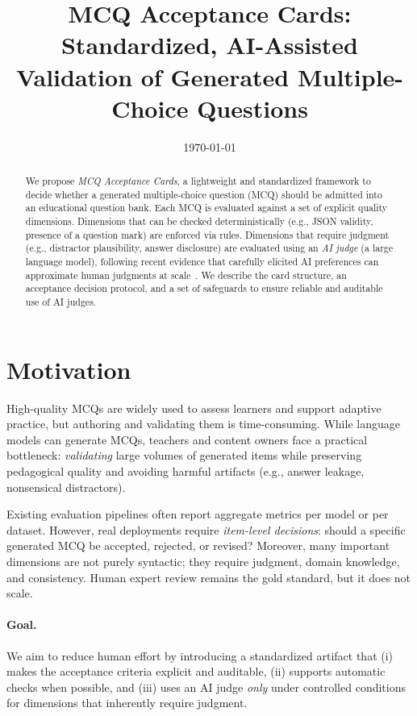 \documentclass[11pt]{article}
\title{MCQ Acceptance Cards: Standardized, AI-Assisted Validation of Generated Multiple-Choice Questions}
\date{\today}
\begin{document}
\maketitle

\begin{abstract}
We propose \emph{MCQ Acceptance Cards}, a lightweight and standardized framework to decide whether a generated multiple-choice question (MCQ) should be admitted into an educational question bank. Each MCQ is evaluated against a set of explicit quality dimensions. Dimensions that can be checked deterministically (e.g., JSON validity, presence of a question mark) are enforced via rules. Dimensions that require judgment (e.g., distractor plausibility, answer disclosure) are evaluated using an \emph{AI judge} (a large language model), following recent evidence that carefully elicited AI preferences can approximate human judgments at scale~\cite{bai2023rlaif}. We describe the card structure, an acceptance decision protocol, and a set of safeguards to ensure reliable and auditable use of AI judges.
\end{abstract}

\section{Motivation}
High-quality MCQs are widely used to assess learners and support adaptive practice, but authoring and validating them is time-consuming. While language models can generate MCQs, teachers and content owners face a practical bottleneck: \emph{validating} large volumes of generated items while preserving pedagogical quality and avoiding harmful artifacts (e.g., answer leakage, nonsensical distractors).

Existing evaluation pipelines often report aggregate metrics per model or per dataset. However, real deployments require \emph{item-level decisions}: should a specific generated MCQ be accepted, rejected, or revised? Moreover, many important dimensions are not purely syntactic; they require judgment, domain knowledge, and consistency. Human expert review remains the gold standard, but it does not scale.

\paragraph{Goal.}
We aim to reduce human effort by introducing a standardized artifact that (i) makes the acceptance criteria explicit and auditable, (ii) supports automatic checks when possible, and (iii) uses an AI judge \emph{only} under controlled conditions for dimensions that inherently require judgment.
\end{document}
